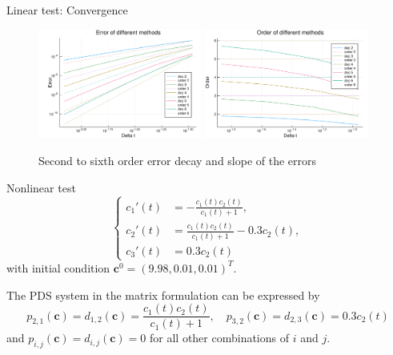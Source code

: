 \documentclass[aspectratio=169]{beamer}
\newcommand{\1}{\begin{pmatrix}
                 1\\
                 1
                \end{pmatrix}}
\def\bc{\mathbf{c}}
\begin{document}
\begin{frame}{Linear test: Convergence}
\begin{figure}[!htp]
\centering
    \includegraphics[width=0.48\textwidth]{images/LinearIntegralErrorOrders26.pdf}
    \includegraphics[width=0.48\textwidth]{images/LinearIntegralSlopesOrders26.pdf}
  \caption{ Second to sixth order error decay and slope of the errors
 }
  \label{fig:Linear_model_error}
\end{figure}

\end{frame}


\begin{frame}{Nonlinear test}
\begin{equation}\label{eq:nonlinear_test}
 \begin{cases}
  c_1'(t)&=-\frac{c_1(t)c_2(t)}{c_1(t)+1},\\
  c_2'(t)&= \frac{c_1(t)c_2(t)}{c_1(t)+1}-0.3c_2(t),\\
  c_3'(t)&=0.3c_2(t)
 \end{cases}
\end{equation}
with initial condition $\bc^0=(9.98,0.01,0.01)^T$. 

The PDS system in the matrix formulation can be expressed by 
\begin{equation*}
 p_{2,1}(\bc)=d_{1,2}(\bc)=\frac{c_1(t)c_2(t)}{c_1(t)+1}, \quad  p_{3,2}(\bc)=d_{2,3}(\bc)=0.3c_2(t)
\end{equation*}
and $p_{i,j}(\bc)=d_{i,j}(\bc)=0$ for all other combinations of $i$ and $j$. 

\end{frame}
\end{document}
